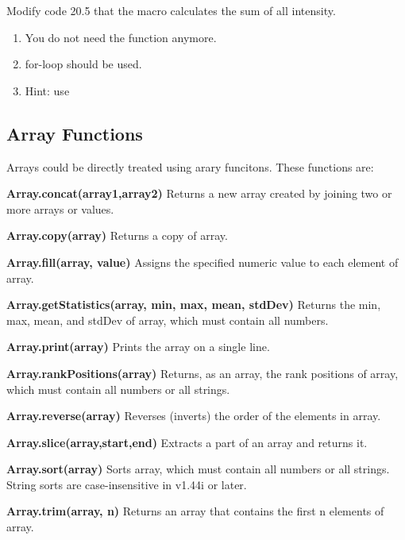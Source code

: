\begin{indentexercise}{1}
Modify code 20.5 that the macro calculates the sum of all intensity.\\
\begin{enumerate}
\item You do not need the function anymore. 
\item for-loop should be used.
\item Hint: use 
\end{enumerate}
\end{indentexercise}

\subsection{Array Functions}

Arrays could be directly treated using arary funcitons. These functions are:
\begin{shaded}\begin{indentCom}
\item \textbf{Array.concat(array1,array2)} Returns a new array created by
joining two or more arrays or values. 
\item \textbf{Array.copy(array)} Returns a copy of array. 
\item \textbf{Array.fill(array, value)} Assigns the specified numeric value to
each element of array.
\item \textbf{Array.getStatistics(array, min, max, mean, stdDev)} Returns the
min, max, mean, and stdDev of array, which must contain all numbers.
\item \textbf{Array.print(array)} Prints the array on a single line. 
\item \textbf{Array.rankPositions(array)} Returns, as an array, the rank
positions of array, which must contain all numbers or all strings. 
\item \textbf{Array.reverse(array)} Reverses (inverts) the order of the
elements in array. 
\item \textbf{Array.slice(array,start,end)} Extracts a part of an array and
returns it. 
\item \textbf{Array.sort(array)} Sorts array, which must contain all numbers
or all strings. String sorts are case-insensitive in v1.44i or later.
\item \textbf{Array.trim(array, n)} Returns an array that contains the first n
elements of array.
\end{indentCom}\end{shaded}
